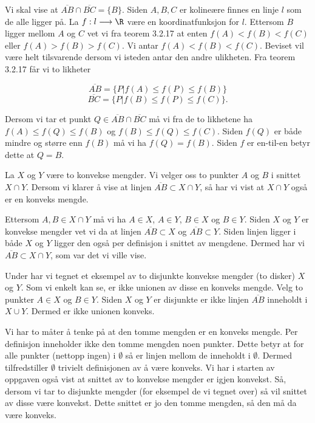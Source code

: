 \begin{oppgave}[3.2.24.d)]
  Vi skal vise at $\overline{AB}\cap \overline{BC} = \{B\}$. Siden $A, B, C$ er kolineære finnes en 
  linje $l$ som de alle ligger på. La $f:l\longrightarrow \R$ være en koordinatfunksjon for $l$. 
  Ettersom $B$ ligger mellom $A$ og $C$ vet vi fra teorem 3.2.17 at enten $f(A)<f(B)<f(C)$ eller 
  $f(A)>f(B)>f(C)$. Vi antar $f(A)<f(B)<f(C)$. Beviset vil være helt tilsvarende dersom vi isteden
  antar den andre ulikheten. Fra teorem 3.2.17 får vi to likheter

  $$ \overline{AB}=\{P|f(A)\leq f(P)\leq f(B)\} $$
  $$ \overline{BC}=\{P|f(B)\leq f(P)\leq f(C)\} .$$

  Dersom vi tar et punkt $Q\in \overline{AB}\cap \overline{BC}$ må vi fra de to likhetene ha
  $ f(A)\leq f(Q)\leq f(B)$ og $f(B)\leq f(Q)\leq f(C)$. Siden $f(Q)$ er både mindre og større enn 
  $f(B)$ må vi ha $f(Q)=f(B)$. Siden $f$ er en-til-en betyr dette at $Q=B$. 
\end{oppgave}

\begin{oppgave}[3.3.1]
  La $X$ og $Y$ være to konvekse mengder. Vi velger oss to punkter $A$ og $B$ i snittet $X\cap Y$. 
  Dersom vi klarer å vise at linjen $\overline{AB}\subset X\cap Y$, så har vi vist at $X\cap Y$ også 
  er en konveks mengde. 

  Ettersom $A, B\in X\cap Y$ må vi ha $A\in X$, $A\in Y$, $B\in X$ og $B\in Y$. Siden $X$ og $Y$ er 
  konvekse mengder vet vi da at linjen $\overline{AB}\subset X$ og $\overline{AB}\subset Y$. Siden 
  linjen ligger i både $X$ og $Y$ ligger den også per definisjon i snittet av mengdene. Dermed har 
  vi $\overline{AB}\subset X\cap Y$, som var det vi ville vise. 

  Under har vi tegnet et eksempel av to disjunkte konvekse mengder (to disker) $X$ og $Y$. Som vi 
  enkelt kan se, er ikke unionen av disse en konveks mengde. Velg to punkter $A\in X$ og $B\in Y$. 
  Siden $X$ og $Y$ er disjunkte er ikke linjen $\overline{AB}$ inneholdt i $X\cup Y$. Dermed er 
  ikke unionen konveks. 

  \begin{figure}[H]
    \centering
    
  \end{figure}
  
  Vi har to måter å tenke på at den tomme mengden er en konveks mengde. Per definisjon inneholder 
  ikke den tomme mengden noen punkter. Dette betyr at for alle punkter (nettopp ingen) i $\emptyset$ 
  så er linjen mellom de inneholdt i $\emptyset$. Dermed tilfredstiller $\emptyset$ trivielt 
  definisjonen av å være konveks. Vi har i starten av oppgaven også vist at snittet av to konvekse 
  mengder er igjen konvekst. Så, dersom vi tar to disjunkte mengder (for eksempel de vi tegnet over)
  så vil snittet av disse være konvekst. Dette snittet er jo den tomme mengden, så den må da være 
  konveks. 
\end{oppgave}

